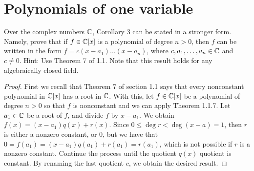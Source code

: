 \section{Polynomials of one variable}


\begin{exercise}{1}
Over the complex numbers $\mathbb{C}$, Corollary 3 can be stated in a stronger form. 
Namely, prove that if $f\in\mathbb{C}[x]$ is a polynomial of degree $n>0$, then $f$ can be written in the form $f=c(x-a_1)\dots(x-a_n)$, where $c,a_1,\dots,a_n\in\mathbb{C}$ and $c\neq 0$. 
Hint: Use Theorem 7 of 1.1. 
Note that this result holds for any algebraically closed field.
\end{exercise}
\begin{proof}
First we recall that Theorem 7 of section 1.1 says that every nonconstant polynomial in $\mathbb{C}[x]$ has a root in $\mathbb{C}$. 
With this, let $f\in\mathbb{C}[x]$ be a polynomial of degree $n>0$ so that $f$ is nonconstant and we can apply Theorem 1.1.7. 
Let $a_1\in\mathbb{C}$ be a root of $f$, and divide $f$ by $x-a_1$. 
We obtain $f(x)=(x-a_1)q(x)+r(x)$. 
Since $0\leq\deg r<\deg (x-a)=1$, then $r$ is either a nonzero constant, or 0, but we have that $0 =f(a_1) =(x-a_1)q(a_1)+r(a_1) =r(a_1)$, which is not possible if $r$ is a nonzero constant. 
Continue the process until the quotient $q(x)$ quotient is constant. 
By renaming the last quotient $c$, we obtain the desired result.
\end{proof}

